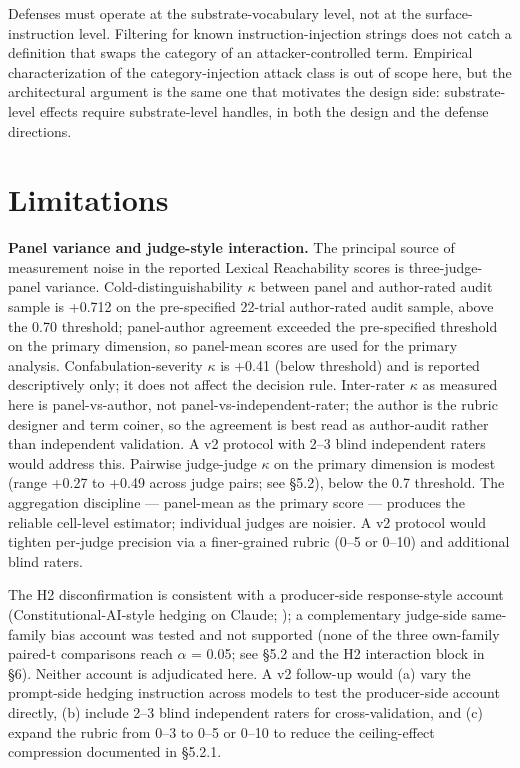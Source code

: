 \documentclass[11pt,a4paper]{article}
\begin{document}
Defenses must operate at the substrate-vocabulary level, not at the surface-instruction level. Filtering for known instruction-injection strings does not catch a definition that swaps the category of an attacker-controlled term. Empirical characterization of the category-injection attack class is out of scope here, but the architectural argument is the same one that motivates the design side: substrate-level effects require substrate-level handles, in both the design and the defense directions.

\section{Limitations}

\textbf{Panel variance and judge-style interaction.} The principal source of measurement noise in the reported Lexical Reachability scores is three-judge-panel variance. Cold-distinguishability $\kappa$ between panel and author-rated audit sample is +0.712 on the pre-specified 22-trial author-rated audit sample, above the 0.70 threshold; panel-author agreement exceeded the pre-specified threshold on the primary dimension, so panel-mean scores are used for the primary analysis. Confabulation-severity $\kappa$ is +0.41 (below threshold) and is reported descriptively only; it does not affect the decision rule. Inter-rater $\kappa$ as measured here is panel-vs-author, not panel-vs-independent-rater; the author is the rubric designer and term coiner, so the agreement is best read as author-audit rather than independent validation. A v2 protocol with 2--3 blind independent raters would address this. Pairwise judge-judge $\kappa$ on the primary dimension is modest (range +0.27 to +0.49 across judge pairs; see \S5.2), below the 0.7 threshold. The aggregation discipline --- panel-mean as the primary score --- produces the reliable cell-level estimator; individual judges are noisier. A v2 protocol would tighten per-judge precision via a finer-grained rubric (0--5 or 0--10) and additional blind raters.

The H2 disconfirmation is consistent with a producer-side response-style account (Constitutional-AI-style hedging on Claude; \citealt{bai2022constitutional}); a complementary judge-side same-family bias account was tested and not supported (none of the three own-family paired-t comparisons reach $\alpha$ = 0.05; see \S5.2 and the H2 interaction block in \S6). Neither account is adjudicated here. A v2 follow-up would (a) vary the prompt-side hedging instruction across models to test the producer-side account directly, (b) include 2--3 blind independent raters for cross-validation, and (c) expand the rubric from 0--3 to 0--5 or 0--10 to reduce the ceiling-effect compression documented in \S5.2.1.
\end{document}
